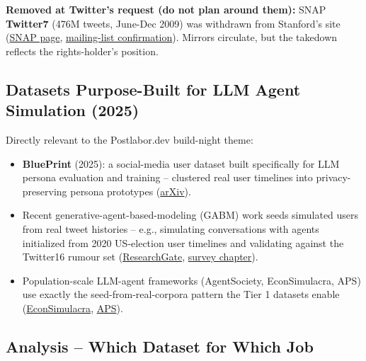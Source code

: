 \documentclass[twocolumn,10pt,letterpaper]{article}
\begin{document}
\textbf{Removed at Twitter's request (do not plan around them):} SNAP \textbf{Twitter7} (476M tweets, June-Dec 2009) was withdrawn from Stanford's site (\href{https://snap.stanford.edu/data/twitter7.html}{SNAP page}, \href{https://groups.google.com/g/snap-datasets/c/4\_sMYlFRf9Q}{mailing-list confirmation}). Mirrors circulate, but the takedown reflects the rights-holder's position.


\subsection{Datasets Purpose-Built for LLM Agent Simulation (2025)}

Directly relevant to the Postlabor.dev build-night theme:


\begin{itemize}
\setlength{\itemsep}{0pt}
\setlength{\parskip}{0pt}
  \item \textbf{BluePrint} (2025): a social-media user dataset built specifically for LLM persona evaluation and training -- clustered real user timelines into privacy-preserving persona prototypes (\href{https://arxiv.org/pdf/2510.02343}{arXiv}).
  \item Recent generative-agent-based-modeling (GABM) work seeds simulated users from real tweet histories -- e.g., simulating conversations with agents initialized from 2020 US-election user timelines and validating against the Twitter16 rumour set (\href{https://www.researchgate.net/publication/397507280\_Simulating\_conversations\_on\_social\_media\_with\_generative\_agent-based\_models}{ResearchGate}, \href{https://dl.acm.org/doi/10.1007/978-3-031-78541-2\_10}{survey chapter}).
  \item Population-scale LLM-agent frameworks (AgentSociety, EconSimulacra, APS) use exactly the seed-from-real-corpora pattern the Tier 1 datasets enable (\href{https://arxiv.org/pdf/2606.26883}{EconSimulacra}, \href{https://arxiv.org/pdf/2605.27419}{APS}).
\end{itemize}

\subsection{Analysis -- Which Dataset for Which Job}
\end{document}

